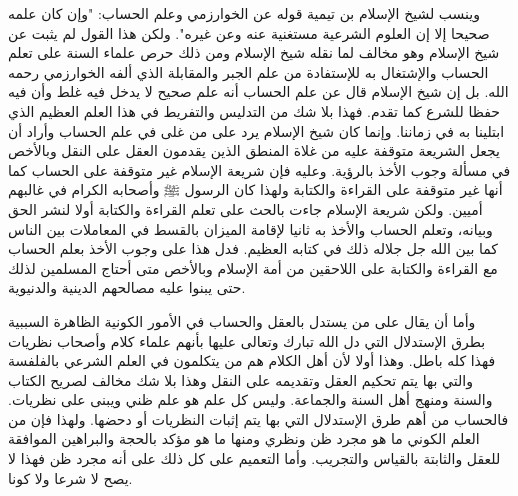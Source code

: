 وينسب لشيخ الإسلام بن تيمية قوله عن الخوارزمي وعلم الحساب: "وإن كان علمه صحيحا إلا إن العلوم الشرعية مستغنية عنه وعن غيره". ولكن هذا القول لم يثبت عن شيخ الإسلام وهو مخالف لما نقله شيخ الإسلام ومن ذلك حرص علماء السنة على تعلم الحساب والإشتغال به للإستفادة من علم الجبر والمقابلة الذي ألفه الخوارزمي رحمه الله. بل إن شيخ الإسلام قال عن علم الحساب أنه علم صحيح لا يدخل فيه غلط وأن فيه حفظا للشرع كما تقدم. فهذا بلا شك من التدليس والتفريط في هذا العلم العظيم الذي ابتلينا به في زماننا. وإنما كان شيخ الإسلام يرد على من غلى في علم الحساب وأراد أن يجعل الشريعة متوقفة عليه من غلاة المنطق الذين يقدمون العقل على النقل وبالأخص في مسألة وجوب الأخذ بالرؤية. وعليه فإن شريعة الإسلام غير متوقفة على الحساب كما أنها غير متوقفة على القراءة والكتابة ولهذا كان الرسول ﷺ وأصحابه الكرام في غالبهم أميين. ولكن شريعة الإسلام جاءت بالحث على تعلم القراءة والكتابة أولا لنشر الحق وبيانه، وتعلم الحساب والأخذ به ثانيا لإقامة الميزان بالقسط في المعاملات بين الناس كما بين الله جل جلاله ذلك في كتابه العظيم. فدل هذا على وجوب الأخذ بعلم الحساب مع القراءة والكتابة على اللاحقين من أمة الإسلام وبالأخص متى أحتاج المسلمين لذلك حتى يبنوا عليه مصالحهم الدينية والدنيوية. 

وأما أن يقال على من يستدل بالعقل والحساب في الأمور الكونية الظاهرة السببية بطرق الإستدلال التي دل الله تبارك وتعالى عليها بأنهم علماء كلام وأصحاب نظريات فهذا كله باطل. وهذا أولا لأن أهل الكلام هم من يتكلمون في العلم الشرعي بالفلفسة والتي بها يتم تحكيم العقل وتقديمه على النقل وهذا بلا شك مخالف لصريح الكتاب والسنة ومنهج أهل السنة والجماعة. وليس كل علم هو علم ظني ويبنى على نظريات. فالحساب من أهم طرق الإستدلال التي بها يتم إثبات النظريات أو دحضها. ولهذا فإن من العلم الكوني ما هو مجرد ظن ونظري ومنها ما هو مؤكد بالحجة والبراهين الموافقة للعقل والثابتة بالقياس والتجريب. وأما التعميم على كل ذلك على أنه مجرد ظن فهذا لا يصح لا شرعا ولا كونا. 


